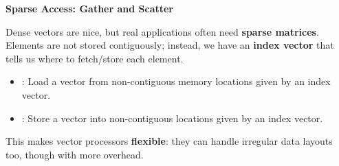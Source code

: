 \highspace
\begin{flushleft}
    \textcolor{Green3}{\faIcon{\speedIcon} \textbf{Sparse Access: Gather and Scatter}}
\end{flushleft}
Dense vectors are nice, but real applications often need \textbf{sparse matrices}. Elements are not stored contiguously; instead, we have an \textbf{index vector} that tells us where to fetch/store each element.
\begin{itemize}
    \item {}: Load a vector from non-contiguous memory locations given by an index vector.
    \item {}: Store a vector into non-contiguous locations given by an index vector.
\end{itemize}
This makes vector processors \textbf{flexible}: they can handle irregular data layouts too, though with more overhead.